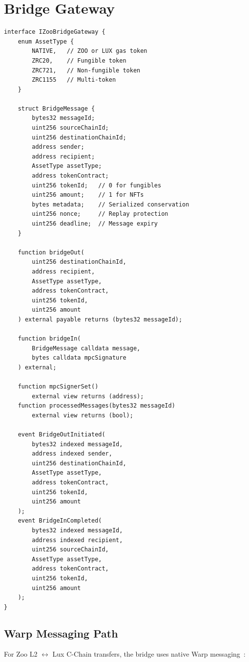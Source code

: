\documentclass[11pt,letterpaper]{article}
\begin{document}
\section{Bridge Gateway}
\label{sec:gateway}

\begin{lstlisting}[language=Solidity,caption=IZooBridgeGateway interface]
interface IZooBridgeGateway {
    enum AssetType {
        NATIVE,   // ZOO or LUX gas token
        ZRC20,    // Fungible token
        ZRC721,   // Non-fungible token
        ZRC1155   // Multi-token
    }

    struct BridgeMessage {
        bytes32 messageId;
        uint256 sourceChainId;
        uint256 destinationChainId;
        address sender;
        address recipient;
        AssetType assetType;
        address tokenContract;
        uint256 tokenId;   // 0 for fungibles
        uint256 amount;    // 1 for NFTs
        bytes metadata;    // Serialized conservation
        uint256 nonce;     // Replay protection
        uint256 deadline;  // Message expiry
    }

    function bridgeOut(
        uint256 destinationChainId,
        address recipient,
        AssetType assetType,
        address tokenContract,
        uint256 tokenId,
        uint256 amount
    ) external payable returns (bytes32 messageId);

    function bridgeIn(
        BridgeMessage calldata message,
        bytes calldata mpcSignature
    ) external;

    function mpcSignerSet()
        external view returns (address);
    function processedMessages(bytes32 messageId)
        external view returns (bool);

    event BridgeOutInitiated(
        bytes32 indexed messageId,
        address indexed sender,
        uint256 destinationChainId,
        AssetType assetType,
        address tokenContract,
        uint256 tokenId,
        uint256 amount
    );
    event BridgeInCompleted(
        bytes32 indexed messageId,
        address indexed recipient,
        uint256 sourceChainId,
        AssetType assetType,
        address tokenContract,
        uint256 tokenId,
        uint256 amount
    );
}
\end{lstlisting}

\subsection{Warp Messaging Path}

For Zoo L2 $\leftrightarrow$ Lux C-Chain transfers, the bridge uses native Warp messaging~\cite{warp2023}:
\end{document}
